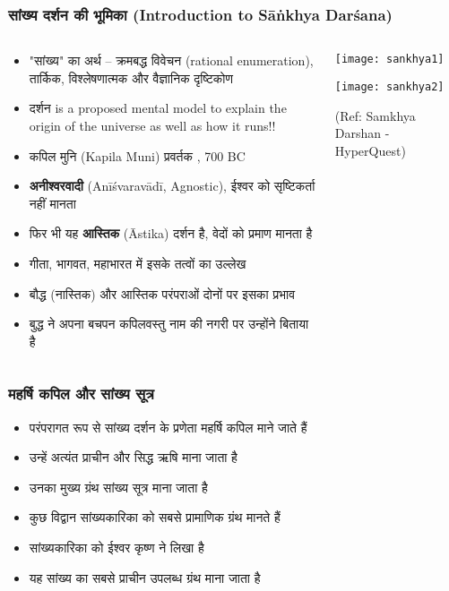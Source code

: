 \begin{frame}[fragile]\frametitle{सांख्य दर्शन की भूमिका (Introduction to Sāṅkhya Darśana)}
\begin{columns}
    \begin{column}[T]{0.6\linewidth}
      \begin{itemize}
        \item "सांख्य" का अर्थ – क्रमबद्ध विवेचन (rational enumeration), तार्किक, विश्लेषणात्मक और वैज्ञानिक दृष्टिकोण
        \item दर्शन is a proposed mental model to explain the origin of the universe as well as how it runs!!		
        \item कपिल मुनि (Kapila Muni)   प्रवर्तक , 700 BC
        \item \textbf{अनीश्वरवादी} (Anīśvaravādī, Agnostic), ईश्वर को सृष्टिकर्ता नहीं मानता
        \item फिर भी यह \textbf{आस्तिक} (Āstika) दर्शन है,  वेदों को प्रमाण मानता है
        \item गीता, भागवत, महाभारत में इसके तत्वों का उल्लेख
        \item बौद्ध (नास्तिक) और आस्तिक परंपराओं दोनों पर इसका प्रभाव
		\item बुद्ध ने अपना बचपन कपिलवस्तु नाम की नगरी पर उन्होंने बिताया है 

      \end{itemize}
    \end{column}
    \begin{column}[T]{0.4\linewidth}
      \begin{center}
        \texttt{[image: sankhya1]}
		
        \texttt{[image: sankhya2]}
		
		{\tiny (Ref: Samkhya Darshan - HyperQuest)}
		
      \end{center}	
    \end{column}
\end{columns}
\end{frame}


\begin{frame}[fragile]\frametitle{महर्षि कपिल और सांख्य सूत्र}
      \begin{itemize}
	\item परंपरागत रूप से सांख्य दर्शन के प्रणेता महर्षि कपिल माने जाते हैं
	\item उन्हें अत्यंत प्राचीन और सिद्ध ऋषि माना जाता है
	\item उनका मुख्य ग्रंथ सांख्य सूत्र माना जाता है
	\item कुछ विद्वान सांख्यकारिका को सबसे प्रामाणिक ग्रंथ मानते हैं
	\item सांख्यकारिका को ईश्वर कृष्ण ने लिखा है
	\item यह सांख्य का सबसे प्राचीन उपलब्ध ग्रंथ माना जाता है
	  \end{itemize}
\end{frame}

